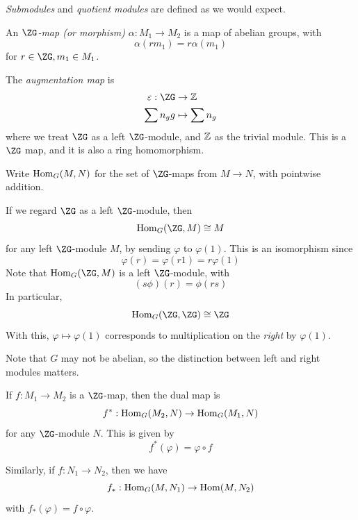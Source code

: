 \documentclass{article}
\begin{document}
\emph{Submodules} and \emph{quotient modules} are defined as we would expect.

\begin{definition}
    [\(\ZG\)-map]
    An \emph{\(\ZG\)-map (or morphism)} \(\alpha : M_1 \to M_2\) is a map of abelian groups, with
    \[\alpha(rm_1) = r\alpha(m_1)\]
    for \(r \in \ZG, m_1 \in M_1\).
\end{definition}

\begin{example}
    The \emph{augmentation map} is
    \begin{align*}
        \epsilon : \ZG &\to \Z \\
        \sum n_g g &\mapsto \sum n_g
    \end{align*}
    where we treat \(\ZG\) as a left \(\ZG\)-module, and \(\mathbb{Z}\) as the trivial module. This is a \(\ZG\) map, and it is also a ring homomorphism.
\end{example}

\begin{notation}
    Write \(\operatorname{Hom}_G(M, N)\) for the set of \(\ZG\)-maps from \(M \to N\), with pointwise addition.
\end{notation}

\begin{example}
    If we regard \(\ZG\) as a left \(\ZG\)-module, then
    \[\Hom_G(\ZG, M) \cong M\]
    for any left \(\ZG\)-module \(M\), by sending \(\varphi\) to \(\varphi(1)\). This is an isomorphism since
    \[\varphi(r) = \varphi(r1) = r\varphi(1)\]
    Note that \(\Hom_G(\ZG, M)\) is a left \(\ZG\)-module, with
    \[(s\phi)(r) = \phi(rs)\]
    In particular,
    \[\Hom_G(\ZG, \ZG) \cong \ZG\]
    With this, \(\varphi \mapsto \varphi(1)\) corresponds to multiplication on the \emph{right} by \(\varphi(1)\).
\end{example}

Note that \(G\) may not be abelian, so the distinction between left and right modules matters.

\begin{definition}
    If \(f : M_1 \to M_2\) is a \(\ZG\)-map, then the dual map is
    \[f^* : \operatorname{Hom}_G(M_2, N) \to \operatorname{Hom}_G(M_1, N)\]
    for any \(\ZG\)-module \(N\). This is given by
    \[f^*(\varphi) = \varphi \circ f\]

    Similarly, if \(f : N_1 \to N_2\), then we have
    \[f_* : \operatorname{Hom}_G(M, N_1) \to \operatorname{Hom}(M, N_2)\]
    with \(f_*(\varphi) = f \circ \varphi\).
\end{definition}
\end{document}
